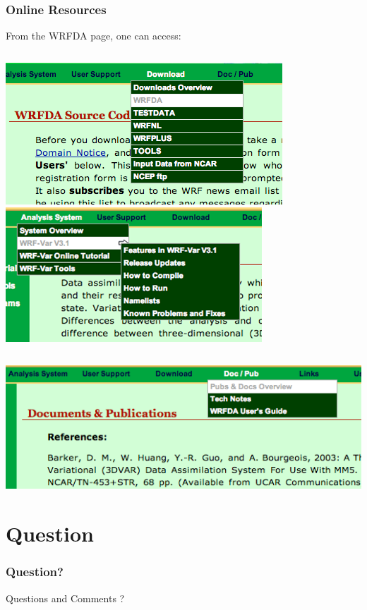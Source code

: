 \documentclass{beamer}
\begin{document}
\begin{frame}
\frametitle{Online Resources}
From the WRFDA page, one can access:
\begin{columns}[c, totalwidth=12cm]
\column{6cm}
\includegraphics[scale=0.4]{wrfdaDownload}
\column{6cm}
\includegraphics[scale=0.4]{wrfdaSystem}
\end{columns}
\begin{center}
\includegraphics[scale=0.4]{wrfdaDocPub}
\end{center}
\end{frame}

\section{Question}
\begin{frame}
\frametitle{Question?}
\begin{center}
Questions and Comments ?
\end{center}
\end{frame}
\end{document}
